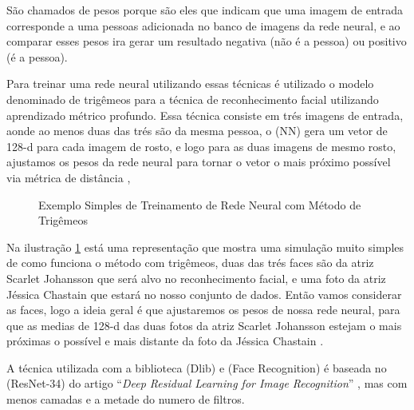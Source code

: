 São chamados de pesos porque são eles que indicam que uma imagem de entrada corresponde a uma pessoas adicionada no banco de imagens da rede neural, e ao comparar esses pesos ira gerar um resultado negativa (não é a pessoa) ou positivo (é a pessoa). 

Para treinar uma rede neural utilizando essas técnicas é utilizado o modelo denominado de trigêmeos para a técnica de reconhecimento facial utilizando aprendizado métrico profundo. Essa técnica consiste em trés imagens de entrada, aonde ao menos duas das trés são da mesma pessoa, o (NN) gera um vetor de 128-d para cada imagem de rosto, e logo para as duas imagens de mesmo rosto, ajustamos os pesos da rede neural para tornar o vetor o mais próximo possível via métrica de distância \cite{adriamRF},

\begin{figure}[H]
	\centering
	\caption{Exemplo Simples de Treinamento de Rede Neural com Método de Trigêmeos}
	\fontsize{9pt}{12pt}\selectfont
	\color{black}
	\def\svgwidth{15cm}
	
	\label{fig:treinsimp}
\end{figure}


Na ilustração \ref{fig:treinsimp} está uma representação que mostra uma simulação muito simples de como funciona o método com trigêmeos, duas das trés faces são da atriz Scarlet Johansson que será alvo no reconhecimento facial, e uma foto da atriz Jéssica Chastain que estará no nosso conjunto de dados. Então vamos considerar as faces, logo a ideia geral é que ajustaremos os pesos de nossa rede neural, para que as medias de 128-d das duas fotos da atriz Scarlet Johansson estejam o mais próximas o possível e mais distante da foto da Jéssica Chastain \cite{adamgeitgey}.

A técnica utilizada com a biblioteca (Dlib) e (Face Recognition) é baseada no (ResNet-34) do artigo “\textit{Deep Residual Learning for Image Recognition}” \cite{DBLP:journals/corr/HeZRS15}, mas com menos camadas e a metade do numero de filtros. 

